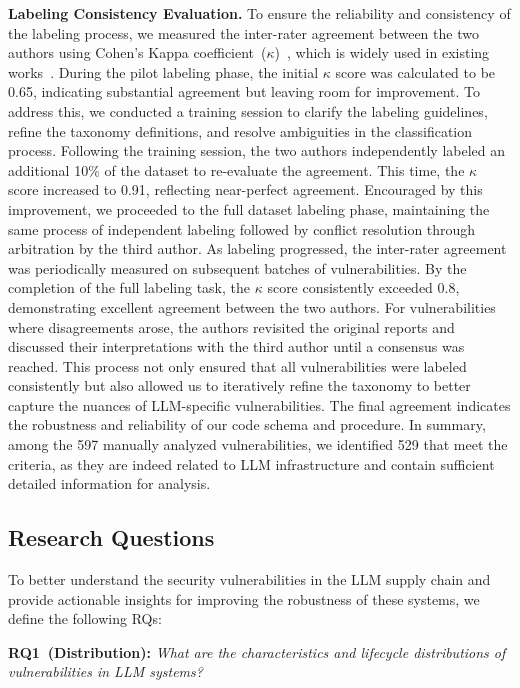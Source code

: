 \noindent \textbf{Labeling Consistency Evaluation.} To ensure the reliability and consistency of the labeling process, we measured the inter-rater agreement between the two authors using Cohen’s Kappa coefficient~($\kappa$)~\cite{cohenkappa}, which is widely used in existing works~\cite{quan2022jsdl,chen2023dlframework,chen2021faults,liu2023distributed}. During the pilot labeling phase, the initial $\kappa$ score was calculated to be 0.65, indicating substantial agreement but leaving room for improvement. To address this, we conducted a training session to clarify the labeling guidelines, refine the taxonomy definitions, and resolve ambiguities in the classification process. Following the training session, the two authors independently labeled an additional 10\% of the dataset to re-evaluate the agreement. This time, the $\kappa$ score increased to 0.91, reflecting near-perfect agreement. Encouraged by this improvement, we proceeded to the full dataset labeling phase, maintaining the same process of independent labeling followed by conflict resolution through arbitration by the third author. As labeling progressed, the inter-rater agreement was periodically measured on subsequent batches of vulnerabilities. By the completion of the full labeling task, the $\kappa$ score consistently exceeded 0.8, demonstrating excellent agreement between the two authors. For vulnerabilities where disagreements arose, the authors revisited the original reports and discussed their interpretations with the third author until a consensus was reached. This process not only ensured that all vulnerabilities were labeled consistently but also allowed us to iteratively refine the taxonomy to better capture the nuances of LLM-specific vulnerabilities. The final agreement indicates the robustness and reliability of our code schema and procedure. In summary, among the 597 manually analyzed vulnerabilities, we identified 529 that meet the criteria, as they are indeed related to LLM infrastructure and contain sufficient detailed information for analysis.

\subsection{Research Questions}
To better understand the security vulnerabilities in the LLM supply chain and provide actionable insights for improving the robustness of these systems, we define the following RQs:

\textbf{RQ1~(Distribution):} \textit{What are the characteristics and lifecycle distributions of vulnerabilities in LLM systems?} 

